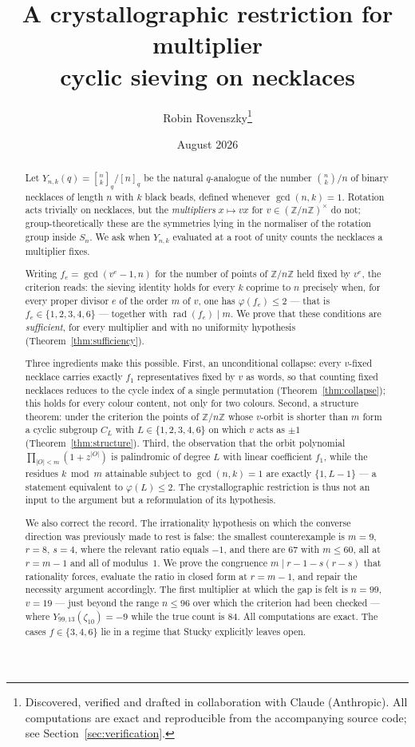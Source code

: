 \documentclass[11pt,a4paper]{article}
\title{A crystallographic restriction for multiplier\\ cyclic sieving on necklaces}
\author{Robin Rovenszky\thanks{Discovered, verified and drafted in collaboration with
Claude (Anthropic). All computations are exact and reproducible from the accompanying
source code; see Section~\ref{sec:verification}.}}
\date{August 2026}
\theoremstyle{plain}
\theoremstyle{definition}
\theoremstyle{remark}
\newcommand{\Z}{\mathbb{Z}}
\newcommand{\Zn}{\Z/n\Z}
\newcommand{\units}[1]{(\Z/#1\Z)^{\times}}
\newcommand{\qint}[1]{[#1]_q}
\newcommand{\qbin}[2]{\genfrac[]{0pt}{}{#1}{#2}_{q}}
\newcommand{\rad}{\operatorname{rad}}
\begin{document}
\maketitle

\begin{abstract}
Let $Y_{n,k}(q)=\qbin{n}{k}\big/\qint{n}$ be the natural $q$-analogue of the number
$\binom{n}{k}/n$ of binary necklaces of length $n$ with $k$ black beads, defined whenever
$\gcd(n,k)=1$. Rotation acts trivially on necklaces, but the \emph{multipliers}
$x\mapsto vx$ for $v\in\units{n}$ do not; group-theoretically these are the symmetries
lying in the normaliser of the rotation group inside $S_n$. We ask when
$Y_{n,k}$ evaluated at a root of unity counts the necklaces a multiplier fixes.

Writing $f_e=\gcd(v^e-1,n)$ for the number of points of $\Zn$ held fixed by $v^e$, the
criterion reads: the sieving identity holds for every $k$ coprime to $n$ precisely when, for
every proper divisor $e$ of the order $m$ of $v$, one has $\varphi(f_e)\le 2$ --- that is
$f_e\in\{1,2,3,4,6\}$ --- together with $\rad(f_e)\mid m$. We prove that these conditions
are \emph{sufficient}, for every multiplier and with no uniformity hypothesis
(Theorem~\ref{thm:sufficiency}).

Three ingredients make this possible. First, an unconditional collapse: every $v$-fixed
necklace carries exactly $f_1$ representatives fixed by $v$ as words, so that counting fixed
necklaces reduces to the cycle index of a single permutation (Theorem~\ref{thm:collapse});
this holds for every colour content, not only for two colours. Second, a structure theorem:
under the criterion the points of $\Zn$ whose $v$-orbit is shorter than $m$ form a cyclic
subgroup $C_L$ with $L\in\{1,2,3,4,6\}$ on which $v$ acts as $\pm1$
(Theorem~\ref{thm:structure}). Third, the observation that the orbit polynomial
$\prod_{|O|<m}(1+z^{|O|})$ is palindromic of degree $L$ with linear coefficient $f_1$, while
the residues $k\bmod m$ attainable subject to $\gcd(n,k)=1$ are exactly $\{1,L-1\}$ --- a
statement equivalent to $\varphi(L)\le2$. The crystallographic restriction is thus not an
input to the argument but a reformulation of its hypothesis.

We also correct the record. The irrationality hypothesis on which the converse direction was
previously made to rest is false: the smallest counterexample is $m=9$, $r=8$, $s=4$, where
the relevant ratio equals $-1$, and there are $67$ with $m\le60$, all at $r=m-1$ and all of
modulus~$1$. We prove the congruence $m\mid r-1-s(r-s)$ that rationality forces, evaluate
the ratio in closed form at $r=m-1$, and repair the necessity argument accordingly. The
first multiplier at which the gap is felt is $n=99$, $v=19$ --- just beyond the range
$n\le96$ over which the criterion had been checked --- where $Y_{99,13}(\zeta_{10})=-9$
while the true count is $84$. All computations are exact. The cases $f\in\{3,4,6\}$ lie in a
regime that Stucky \cite{stucky} explicitly leaves open.
\end{abstract}
\end{document}

